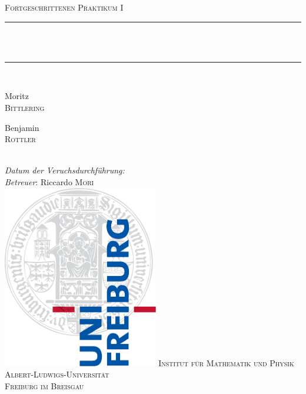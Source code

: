 \newcommand{\HRule}{\rule{\linewidth}{0.5mm}}
\begin{titlepage}
\begin{center}
  \textsc{\Large Fortgeschrittenen Praktikum I}\\[0.5cm]
  \HRule \\[0.4cm]
  { \huge \bfseries \exptitle}\\
  \HRule \\[1.5cm]
  
  \begin{minipage}{0.4\textwidth}
    \begin{flushleft} \large
      Moritz \\ \textsc{Bittlering}
    \end{flushleft}
  \end{minipage}
  \hfill
  \begin{minipage}{0.4\textwidth}
    \begin{flushright} \large
      Benjamin \\ \textsc{Rottler}
    \end{flushright}
  \end{minipage}
  \\[1cm]
  \large 
  \emph{Datum der Veruchsdurchführung:} \expdate  \\
  \emph{Betreuer}: Riccardo \textsc{Mori} \\[3cm]
  \includegraphics[height=8cm]{../../img/logo_uni.pdf}
  \vfill
  \normalsize
  \textsc{Institut für Mathematik und Physik} \\
  \textsc{Albert-Ludwigs-Universität} \\
  \textsc{Freiburg im Breisgau}
\end{center}
\end{titlepage}